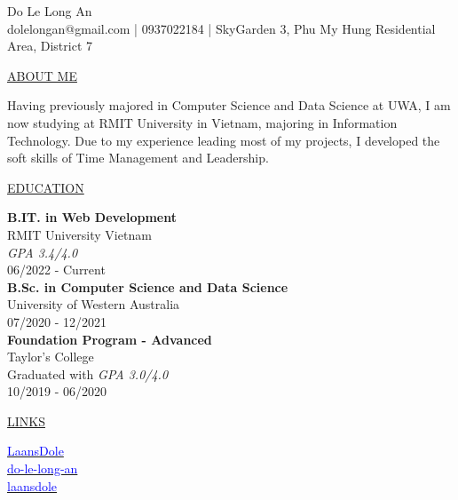 \documentclass[11pt]{article}
\newcommand{\resumetitle}[3]{
    \AddToShipoutPictureBG{
        \AtPageUpperLeft {
        \raisebox{-0.09\paperheight}{
            \color{black!85}\rule{2\paperwidth}{\paperheight}}
        }}
    \begin{Center}
        \begingroup
        \titlethin
        \color{black!10}\Huge{#1}
        \titlethick
        \color{black!5}\Huge{#2} \\
        \vspace{2mm}
        \textrm{\color{black!15}\Large{#3}}
        \endgroup
    \end{Center}
    \vspace{7mm}
}
\newcommand{\betteruline}[1]{
    \uline{#1}
}
\newcommand{\sectiontitle}[1]{
    \begingroup
        \titlebold
        \betteruline{\Large\uppercase{#1}  }
        \vspace{1.7mm}
    \endgroup
}
\newcommand{\sectioncontent}[1]{
    \begingroup
        \begin{FlushLeft}
        \vspace{-3mm}
        \sffamily\small#1
        \end{FlushLeft}
    \endgroup
    \vspace{2mm}
}
\begin{document}
    \resumetitle{Do}{Le Long An} {
        dolelongan@gmail.com |
        0937022184 |
        SkyGarden 3, Phu My Hung Residential Area, District 7
    }

    \setlength{\columnsep}{7mm}
    \begin{paracol}{2}

    \sectiontitle{about me}
    \sectioncontent{
        Having previously majored in Computer Science and Data Science at UWA, I am now studying at RMIT University in Vietnam, majoring in Information Technology. Due to my experience leading most of my projects, I developed the soft skills of Time Management and Leadership.
    }

    \sectiontitle{education}
    \sectioncontent{
        \textbf{B.IT. in Web Development} \\
        RMIT University Vietnam \\
        \textit{GPA 3.4/4.0} \\
        \vspace{1mm}
        \textcolor{black!70}{06/2022 - Current} \\
        \vspace{2mm}
        \textbf{B.Sc. in Computer Science and Data Science} \\
        University of Western Australia \\
        \vspace{1mm}
        \textcolor{black!70}{07/2020 - 12/2021} \\
         \vspace{2mm}
         \textbf{Foundation Program - Advanced} \\
        Taylor's College \\
        Graduated with \textit{GPA 3.0/4.0} \\
        \vspace{1mm}
        \textcolor{black!70}{10/2019 - 06/2020} \\
    }

    \sectiontitle{links}
    \sectioncontent{
        \hspace{3mm}
        \href{https://github.com/LaansDole}{\textcolor{blue}{LaansDole}} \\
        \vspace{2mm}
        \faIcon{linkedin-in}\hspace{3mm}
        \href{https://www.linkedin.com/in/do-le-long-an/}{\textcolor{blue}{do-le-long-an}} \\
        \vspace{2mm}
        \faIcon{facebook}\hspace{3mm}
        \href{https://www.facebook.com/laansdole/}{\textcolor{blue}{laansdole}}
    }


\end{paracol}
\end{document}

